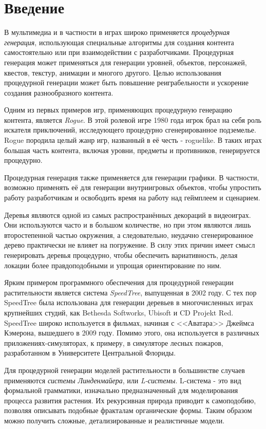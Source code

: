 \chapter{Введение}

В мультимедиа и в частности в играх широко применяется \emph{процедурная генерация}, использующая специальные алгоритмы для создания контента самостоятельно или при взаимодействии с разработчиками. Процедурная генерация может применяться для генерации уровней, объектов, персонажей, квестов, текстур, анимации и многого другого. Целью использования процедурной генерации может быть повышение реиграбельности и ускорение создания разнообразного контента.

Одним из первых примеров игр, применяющих процедурную генерацию контента, является \emph{Rogue}. В этой ролевой игре 1980 года игрок брал на себя роль искателя приключений, исследующего процедурно сгенерированное подземелье. Rogue породила целый жанр игр, названный в её честь - roguelike. В таких играх большая часть контента, включая уровни, предметы и противников, генерируется процедурно.

Процедурная генерация также применяется для генерации графики. В частности, возможно применять её для генерации внутриигровых объектов, чтобы упростить работу разработчикам и освободить время на работу над геймплеем и сценарием. 

Деревья являются одной из самых распространённых декораций в видеоиграх. Они используются часто и в большом количестве, но при этом являются лишь второстепенной частью окружения, а следовательно, неудачно сгенерированное дерево практически не влияет на погружение. В силу этих причин имеет смысл генерировать деревья процедурно, чтобы обеспечить вариативность, делая локации более правдоподобными и упрощая ориентирование по ним. 

Ярким примером программного обеспечения для процедурной генерации растительности является система \emph{SpeedTree}, выпущенная в 2002 году. С тех пор SpeedTree была использована для генерации деревьев в многочисленных играх крупнейших студий, как Bethesda Softworks, Ubisoft и CD Projekt Red. SpeedTree широко используется в фильмах, начиная с <<Аватара>> Джеймса Кэмерона, вышедшего в 2009 году. Помимо этого, она используется в различных приложениях-симуляторах, к примеру, в симуляторе лесных пожаров, разработанном в Университете Центральной Флориды.

Для процедурной генерации моделей растительности в большинстве случаев применяются \emph{системы Линденмайера}, или \emph{L-системы}. L-система - это вид формальной грамматики, изначально предназначенный для моделирования процесса развития растения. Их рекурсивная природа приводит к самоподобию, позволяя описывать подобные фракталам органические формы. Таким образом можно получить сложные, детализированные и реалистичные модели.

